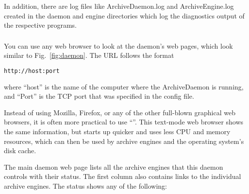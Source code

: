 \noindent In addition, there are log files like ArchiveDaemon.log and
ArchiveEngine.log created in the daemon and engine directories which
log the diagnostics output of the respective programs.

\subsubsection{} \label{sec:daemonserver}
You can use any web browser to look at the daemon's web pages,
which look similar to Fig.~\ref{fig:daemon}.
The URL follows the format
\begin{lstlisting}[keywordstyle=\sffamily]
    http://host:port
\end{lstlisting}
\noindent where ``host'' is the name of the computer where the
ArchiveDaemon is running, and ``Port'' is the TCP port that was
specified in the config file.

\NOTE Instead of using Mozilla, Firefox, or any of the other
full-blown graphical web browsers, it is often more practical to use
``''. This text-mode web browser shows the same
information, but starts up quicker and uses less CPU
and memory resources, which can then be used by archive engines and the
operating system's disk cache.

The main daemon web page lists all the archive engines that this
daemon controls with their status. The first column also contains
links to the individual archive engines. The status shows any of the
following:

